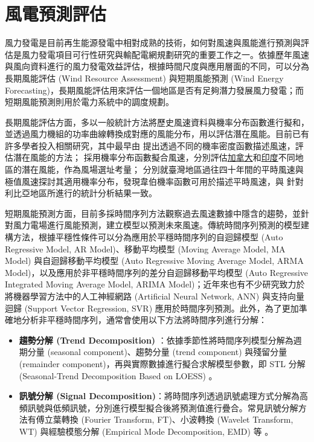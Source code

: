 \section{風電預測評估}

風力發電是目前再生能源發電中相對成熟的技術，如何對風速與風能進行預測與評估是風力發電項目可行性研究與輸配電網規劃研究的重要工作之一。依據歷年風速與風向資料進行的風力發電效益評估，根據時間尺度與應用層面的不同，可以分為長期風能評估 (Wind Resource Assessment) 與短期風能預測 (Wind Energy Forecasting)，長期風能評估用來評估一個地區是否有足夠潛力發展風力發電；而短期風能預測則用於電力系統中的調度規劃。

長期風能評估方面，多以一般統計方法將歷史風速資料與機率分布函數進行擬和，並透過風力機組的功率曲線轉換成對應的風能分布，用以評估潛在風能。目前已有許多學者投入相關研究，其中最早由 \cite{justus1976nationwide} 提出透過不同的機率密度函數描述風速，評估潛在風能的方法；\cite{nigim2007heuristic, panda1990stochastic, kumar2019wind} 採用機率分布函數擬合風速，分別評估\uline{加拿大}和\uline{印度}不同地區的潛在風能，作為風場選址考量；\cite{chuang2001wind} 分別就臺灣地區過往四十年間的平時風速與極值風速探討其適用機率分布，發現韋伯機率函數可用於描述平時風速，與 \cite{teyabeen2015statistical} 針對利比亞地區所進行的統計分析結果一致。

短期風能預測方面，目前多採時間序列方法觀察過去風速數據中隱含的趨勢，並針對風力電場進行風能預測，建立模型以預測未來風速。傳統時間序列預測的模型建構方法，根據平穩性條件可以分為應用於平穩時間序列的自迴歸模型 (Auto Regressive Model, AR Model)、移動平均模型 (Moving Average Model, MA Model) 與自迴歸移動平均模型 (Auto Regressive Moving Average Model, ARMA Model)，以及應用於非平穩時間序列的差分自迴歸移動平均模型 (Auto Regressive Integrated Moving Average Model, ARIMA Model)；近年來也有不少研究致力於將機器學習方法中的人工神經網路 (Artificial Neural Network, ANN) 與支持向量迴歸 (Support Vector Regression, SVR) 應用於時間序列預測。此外，為了更加準確地分析非平穩時間序列，通常會使用以下方法將時間序列進行分解：

\begin{itemize}
  \item \textbf{趨勢分解 (Trend Decomposition)} ：依據季節性將時間序列模型分解為週期分量 (seasonal component)、趨勢分量 (trend component) 與殘留分量 (remainder component)，再與實際數據進行擬合求解模型參數，即 STL 分解 (Seasonal-Trend Decomposition Based on LOESS) \cite{cleveland1990stl}。
  \item \textbf{訊號分解 (Signal Decomposition)}：將時間序列透過訊號處理方式分解為高頻訊號與低頻訊號，分別進行模型擬合後將預測值進行疊合。常見訊號分解方法有傅立葉轉換 (Fourier Transform, FT)、小波轉換 (Wavelet Transform, WT) 與經驗模態分解 (Empirical Mode Decomposition, EMD) 等 \cite{foster1996wavelets}。
\end{itemize}

